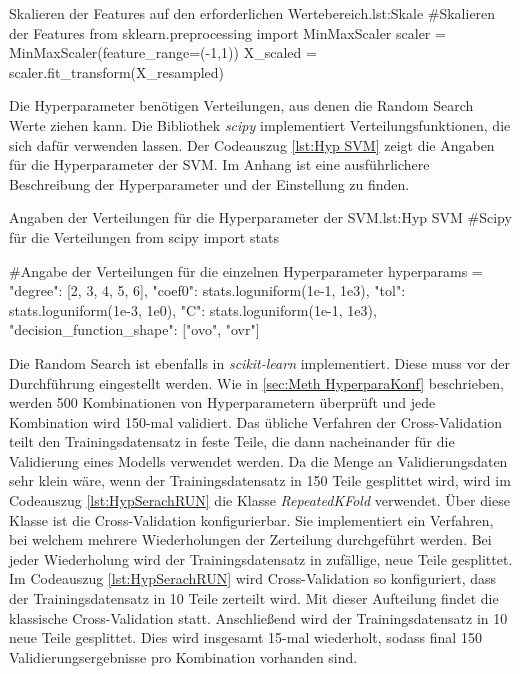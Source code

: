 \begin{pythoncode}{Skalieren der Features auf den erforderlichen Wertebereich.}{lst:Skale}
#Skalieren der Features 
from sklearn.preprocessing import MinMaxScaler
scaler = MinMaxScaler(feature_range=(-1,1))
X_scaled = scaler.fit_transform(X_resampled)
\end{pythoncode}

Die Hyperparameter benötigen Verteilungen, aus denen die Random Search Werte ziehen kann. Die Bibliothek \textit{scipy} implementiert Verteilungsfunktionen, die sich dafür verwenden lassen. Der Codeauszug \ref{lst:Hyp SVM} zeigt die Angaben für die Hyperparameter der SVM. Im Anhang ist eine ausführlichere Beschreibung der Hyperparameter und der Einstellung zu finden.

\begin{pythoncode}{Angaben der Verteilungen für die Hyperparameter der SVM.}{lst:Hyp SVM}
#Scipy für die Verteilungen
from scipy import stats

#Angabe der Verteilungen für die einzelnen Hyperparameter
hyperparams =  {"degree": [2, 3, 4, 5, 6],
                "coef0": stats.loguniform(1e-1, 1e3),
                "tol": stats.loguniform(1e-3, 1e0),
                "C": stats.loguniform(1e-1, 1e3),
                "decision_function_shape": ["ovo", "ovr"]}
\end{pythoncode}

Die Random Search ist ebenfalls in \textit{scikit-learn} implementiert. Diese muss vor der Durchführung eingestellt werden. Wie in \autoref{sec:Meth HyperparaKonf} beschrieben, werden 500 Kombinationen von Hyperparametern überprüft und jede Kombination wird 150-mal validiert. Das übliche Verfahren der Cross-Validation teilt den Trainingsdatensatz in feste Teile, die dann nacheinander für die Validierung eines Modells verwendet werden. Da die Menge an Validierungsdaten sehr klein wäre, wenn der Trainingsdatensatz in 150 Teile gesplittet wird, wird im Codeauszug \ref{lst:HypSerachRUN} die Klasse \textit{RepeatedKFold} verwendet. Über diese Klasse ist die Cross-Validation konfigurierbar. Sie implementiert ein Verfahren, bei welchem mehrere Wiederholungen der Zerteilung durchgeführt werden. Bei jeder Wiederholung wird der Trainingsdatensatz in zufällige, neue Teile gesplittet. Im Codeauszug \ref{lst:HypSerachRUN} wird Cross-Validation so konfiguriert, dass der Trainingsdatensatz in 10 Teile zerteilt wird. Mit dieser Aufteilung findet die klassische Cross-Validation statt. Anschließend wird der Trainingsdatensatz in 10 neue Teile gesplittet. Dies wird insgesamt 15-mal wiederholt, sodass final 150 Validierungsergebnisse pro Kombination vorhanden sind. \par

